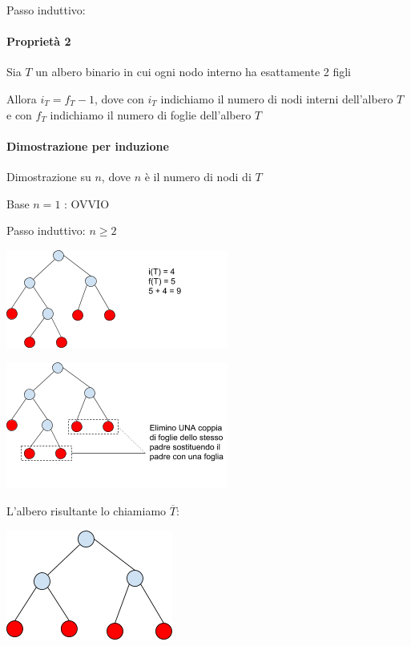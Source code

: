 \documentclass[11pt,a4paper,twoside,openright]{book}
\let\oldparagraph\paragraph
\renewcommand{\paragraph}[1]{\oldparagraph{#1}\mbox{}}
\begin{document}
{{{{Passo induttivo:}



\paragraph{Proprietà 2}

{Sia $T$ un albero binario in cui ogni nodo interno ha esattamente 2 figli}

{Allora $i_T=f_T-1$, dove con $i_T$ indichiamo il numero di nodi interni dell'albero $T$ e con $f_T$ indichiamo il numero di foglie dell'albero $T$}

\paragraph{Dimostrazione per induzione}

{Dimostrazione su $n$, dove $n$ è il numero di nodi di $T$}

{Base $n=1$ : OVVIO}

{Passo induttivo: $n \geq 2$}

{\includegraphics{images/image525.png}}

{\includegraphics{images/image536.png}}

{L'albero risultante lo chiamiamo $\overline{T}$:}

{\includegraphics{images/image522.png}}

}}}
\end{document}

